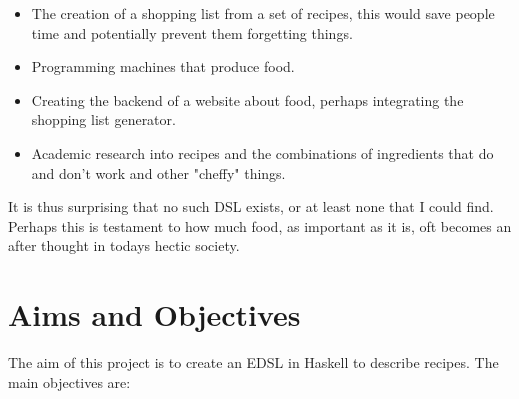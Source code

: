 \documentclass[12pt]{article}
\begin{document}
    \begin{itemize}

        \item The creation of a shopping list from a set of
        recipes, this would save people time and potentially prevent them
        forgetting things.

        \item Programming machines that produce food.

        \item Creating the backend of a website about food, perhaps
        integrating the shopping list generator.

        \item Academic research into recipes and the combinations
        of ingredients that do and don't work and other "cheffy"
        things.

    \end{itemize}

    It is thus surprising that no such DSL exists, or at least none
    that I could find. Perhaps this is testament to how much food,
    as important as it is, oft becomes an after thought in todays
    hectic society.

    \section{Aims and Objectives}

    The aim of this project is to create an EDSL in Haskell to describe
    recipes. The main objectives are:
\end{document}
